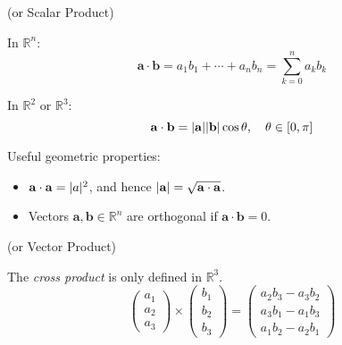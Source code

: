 \begin{multicols}{2}

    \begin{CheatsheetEntryFrame}

         {\tiny (or Scalar Product)}

        In $\mathbb{R}^n$:
        \begin{equation*}
            \mathbf{a} \cdot \mathbf{b} = a_1 b_1 + \cdots + a_n b_n = \sum_{k=0}^n{a_k b_k}
        \end{equation*}

        In $\mathbb{R}^2$ or $\mathbb{R}^3$:
        \begin{equation*}
            \mathbf{a} \cdot \mathbf{b} = \abs*{\mathbf{a}} \abs*{\mathbf{b}} \cos{\theta}
            ,\quad \theta \in [0, \pi]
        \end{equation*}

        Useful geometric properties:
        \begin{itemize}
            \item $\mathbf{a} \cdot \mathbf{a} = \abs*{a}^2$, and hence $\abs*{\mathbf{a}} = \sqrt{\mathbf{a} \cdot \mathbf{a}}$.
            \item Vectors $\mathbf{a}, \mathbf{b} \in \mathbb{R}^n$ are orthogonal if $\mathbf{a} \cdot \mathbf{b} = 0$.
        \end{itemize}

    \end{CheatsheetEntryFrame}

    \begin{CheatsheetEntryFrame}

         {\tiny (or Vector Product)}

        The \textit{cross product} is only defined in $\mathbb{R}^3$.
        \begin{equation*}
            \begin{pmatrix}
                a_1 \\
                a_2 \\
                a_3
            \end{pmatrix}
            \times
            \begin{pmatrix}
                b_1 \\
                b_2 \\
                b_3
            \end{pmatrix}
            =
            \begin{pmatrix}
                a_2 b_3 - a_3 b_2 \\
                a_3 b_1 - a_1 b_3 \\
                a_1 b_2 - a_2 b_1
            \end{pmatrix}
        \end{equation*}


\end{CheatsheetEntryFrame}
\end{multicols}
